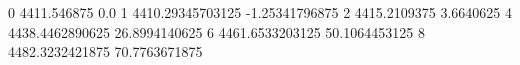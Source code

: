 0 4411.546875 0.0
1 4410.29345703125 -1.25341796875
2 4415.2109375 3.6640625
4 4438.4462890625 26.8994140625
6 4461.6533203125 50.1064453125
8 4482.3232421875 70.7763671875

